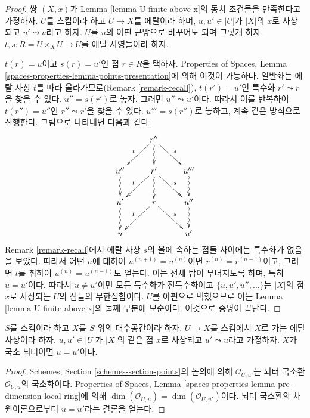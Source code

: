 \begin{proof}
쌍 $(X, x)$가 Lemma \ref{lemma-U-finite-above-x}의 동치 조건들을
만족한다고 가정하자. $U$를 스킴이라 하고 $U \to X$를 에탈이라 하며,
$u, u' \in |U|$가 $|X|$의 $x$로 사상되고 $u' \leadsto u$라고 하자.
$U$를 $u$의 아핀 근방으로 바꾸어도 되며 그렇게 하자.
$t, s : R = U \times_X U \to U$를 에탈 사영들이라 하자.

\medskip\noindent
$t(r) = u$이고 $s(r) = u'$인 점 $r \in R$을 택하자.
Properties of Spaces, Lemma
\ref{spaces-properties-lemma-points-presentation}에 의해 이것이 가능하다.
일반화는 에탈 사상 $t$를 따라 올라가므로(Remark
\ref{remark-recall}), $t(r') = u'$인 특수화 $r' \leadsto r$을 찾을 수
있다. $u'' = s(r')$로 놓자. 그러면 $u'' \leadsto u'$이다.
따라서 이를 반복하여 $t(r'') = u''$인 $r'' \leadsto r'$을 찾을 수 있다.
$u''' = s(r'')$로 놓하고, 계속 같은 방식으로 진행한다.
그림으로 나타내면 다음과 같다.
$$
\xymatrix{
& r'' \ar[rd]^s \ar[ld]_t \ar@{~>}[d] & \\
u'' \ar@{~>}[d] & r' \ar[rd]^s \ar[ld]_t \ar@{~>}[d] & u''' \ar@{~>}[d] \\
u' \ar@{~>}[d] & r \ar[rd]^s \ar[ld]_t & u'' \ar@{~>}[d] \\
u & & u'
}
$$
Remark \ref{remark-recall}에서 에탈 사상 $s$의 올에 속하는 점들 사이에는
특수화가 없음을 보았다. 따라서 어떤 $n$에 대하여
$u^{(n + 1)} = u^{(n)}$이면 $r^{(n)} = r^{(n - 1)}$이고, 그러면
$t$를 취하여 $u^{(n)} = u^{(n - 1)}$도 얻는다.
이는 전체 탑이 무너지도록 하며, 특히 $u = u'$이다.
따라서 $u \not = u'$이면 모든 특수화가 진특수화이고
$\{u, u', u'', \ldots\}$는 $|X|$의 점 $x$로 사상되는 $U$의
점들의 무한집합이다. $U$를 아핀으로 택했으므로 이는 Lemma
\ref{lemma-U-finite-above-x}의 둘째 부분에 모순이다. 이것으로
증명이 끝난다.
\end{proof}

\begin{lemma}
\label{lemma-no-specializations-map-to-same-point-Noetherian}
$S$를 스킴이라 하고 $X$를 $S$ 위의 대수공간이라 하자.
$U \to X$를 스킴에서 $X$로 가는 에탈 사상이라 하자.
$u, u' \in |U|$가 $|X|$의 같은 점 $x$로 사상되고
$u' \leadsto u$라고 가정하자. $X$가 국소 뇌터이면 $u = u'$이다.
\end{lemma}

\begin{proof}
Schemes, Section \ref{schemes-section-points}의 논의에 의해
$\mathcal{O}_{U, u'}$는 뇌터 국소환 $\mathcal{O}_{U, u}$의
국소화이다. Properties of Spaces, Lemma
\ref{spaces-properties-lemma-pre-dimension-local-ring}에 의해
$\dim(\mathcal{O}_{U, u}) = \dim(\mathcal{O}_{U, u'})$이다.
뇌터 국소환의 차원이론으로부터 $u = u'$라는 결론을 얻는다.
\end{proof}

